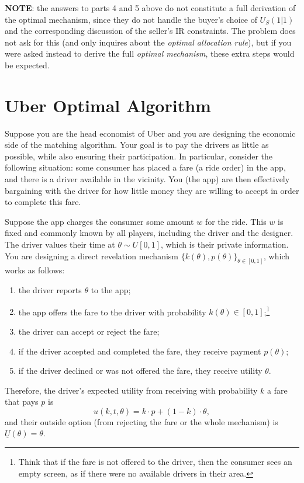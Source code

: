 \documentclass[a4paper]{article}
\begin{document}
\textbf{NOTE}: the answers to parts 4 and 5 above do not constitute a full derivation of the optimal mechanism, since they do not handle the buyer's choice of $U_S(1|1)$ and the corresponding discussion of the seller's IR constraints. The problem does not ask for this (and only inquires about the \emph{optimal allocation rule}), but if you were asked instead to derive the full \emph{optimal mechanism}, these extra steps would be expected.
\fi


	
\section{Uber Optimal Algorithm}
Suppose you are the head economist of Uber and you are designing the economic side of the matching algorithm. Your goal is to pay the drivers as little as possible, while also ensuring their participation. In particular, consider the following situation: some consumer has placed a fare (a ride order) in the app, and there is a driver available in the vicinity. You (the app) are then effectively bargaining with the driver for how little money they are willing to accept in order to complete this fare.

Suppose the app charges the consumer some amount $w$ for the ride. This $w$ is fixed and commonly known by all players, including the driver and the designer. The driver values their time at $\theta \sim U[0,1]$, which is their private information. You are designing a direct revelation mechanism $\{k(\theta),p(\theta)\}_{\theta\in[0,1]}$, which works as follows:
\begin{enumerate}[label=(\roman{enumi})]
	\item the driver reports $\theta$ to the app;
	\item the app offers the fare to the driver with probability $k(\theta) \in [0,1]$;\footnote{Think that if the fare is not offered to the driver, then the consumer sees an empty screen, as if there were no available drivers in their area.}
	\item the driver can accept or reject the fare;
	\item if the driver accepted and completed the fare, they receive payment $p(\theta)$;
	\item if the driver declined or was not offered the fare, they receive utility $\theta$.
\end{enumerate}

Therefore, the driver's expected utility from receiving with probability $k$ a fare that pays $p$ is
$$u(k,t,\theta) = k \cdot p + (1-k) \cdot \theta,$$
and their outside option (from rejecting the fare or the whole mechanism) is $\underline{U}(\theta) = \theta$.
\end{document}
